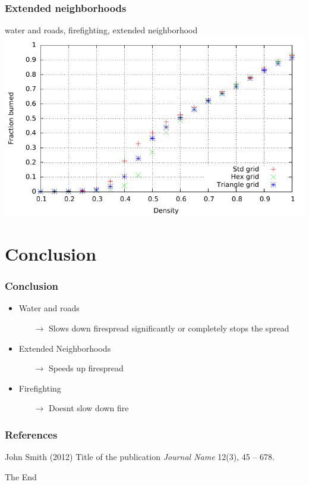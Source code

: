 \documentclass{beamer}
\begin{document}
\begin{frame}
\frametitle{Extended neighborhoods}
water and roads, firefighting, extended neighborhood
\centering
\includegraphics[width=\textwidth]{imgs/plot/ex6/fracburned.pdf}
\end{frame}
\section{Conclusion} 

\begin{frame}
\frametitle{Conclusion}
\begin{itemize}
\item{Water and roads}
\pause 
\begin{itemize}
\item[$\rightarrow$] Slows down firespread significantly or completely stops the spread
\end{itemize}
\pause 
\item{Extended Neighborhoods}
\pause 
\begin{itemize}
\item[$\rightarrow$]  Speeds up firespread
\end{itemize}
\pause
\item{Firefighting}
\pause 
\begin{itemize}
\item[$\rightarrow$]  Doesnt slow down fire
\end{itemize}
\end{itemize}
\end{frame}



\begin{frame}
\frametitle{References}
\footnotesize{
\begin{thebibliography}{99} %
 John Smith (2012)
\newblock Title of the publication
\newblock \emph{Journal Name} 12(3), 45 -- 678.
\end{thebibliography}
}
\end{frame}


\begin{frame}
\Huge{\centerline{The End}}
\end{frame}

\end{document}
